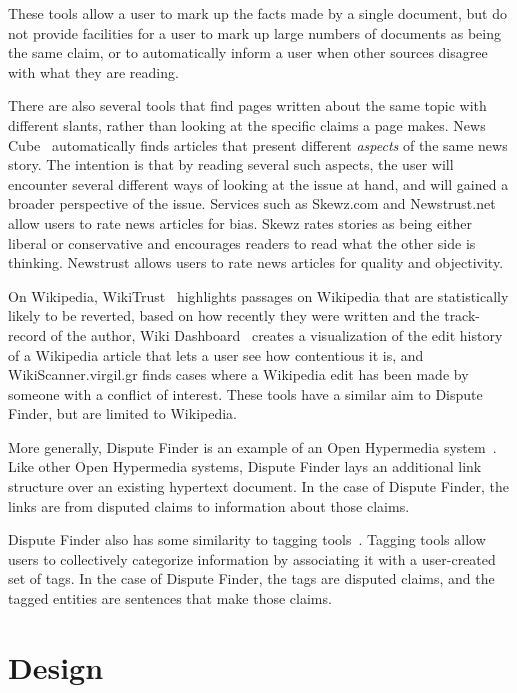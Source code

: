 \documentclass{www2010-accepted}
\begin{document}
These tools allow a user to mark up the facts made by a single document, but do not provide facilities for a user to mark up large numbers of documents as being the same claim, or to automatically inform a user when other sources disagree with what they are reading.

There are also several tools that find pages written about the same topic with different slants, rather than looking at the specific claims a page makes. News Cube~\cite{Park2009} automatically finds articles that present different {\it aspects} of the same news story. The intention is that by reading several such aspects, the user will encounter several different ways of looking at the issue at hand, and will gained a broader perspective of the issue. 
Services such as Skewz.com and Newstrust.net allow users to rate news articles for bias. Skewz rates stories as being either liberal or conservative and encourages readers to read what the other side is thinking. Newstrust allows users to rate news articles for quality and objectivity. 

On Wikipedia, WikiTrust~\cite{Adler2008a} highlights passages on Wikipedia that are statistically likely to be reverted, based on how recently they were written and the track-record of the author, Wiki Dashboard~\cite{Kittur2008} creates a visualization of the edit history of a Wikipedia article that lets a user see how contentious it is, and WikiScanner.virgil.gr finds cases where a Wikipedia edit has been made by someone with a conflict of interest. These tools have a similar aim to Dispute Finder, but are limited to Wikipedia.

More generally, Dispute Finder is an example of an Open Hypermedia system~\cite{Bouvin2000,Wiil1996}. Like other Open Hypermedia systems, Dispute Finder lays an additional link structure over an existing hypertext document. In the case of Dispute Finder, the links are from disputed claims to information about those claims.

Dispute Finder also has some similarity to tagging tools~\cite{Marlow2006,Golder2006}. Tagging tools allow users to collectively categorize information by associating it with a user-created set of tags. In the case of Dispute Finder, the tags are disputed claims, and the tagged entities are sentences that make those claims. 

\section{Design}
\end{document}
